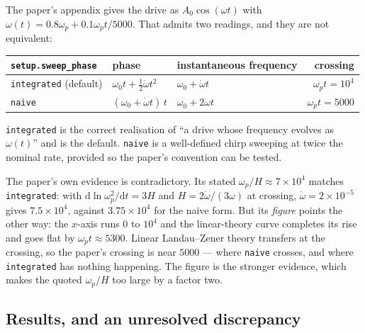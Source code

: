 \documentclass[11pt,a4paper]{article}
\newcommand{\code}[1]{\texttt{\small #1}}
\newcommand{\wpt}{\omega_p t}
\begin{document}
The paper's appendix gives the drive as $A_0\cos(\omega t)$ with
$\omega(t) = 0.8\omega_p + 0.1\omega_p t/5000$. That admits two readings, and they
are not equivalent:

\begin{center}\small
\begin{tabular}{@{}lllr@{}}
\toprule
\code{setup.sweep\_phase} & phase & instantaneous frequency & crossing \\
\midrule
\code{integrated} (default) & $\omega_0 t + \tfrac12\dot\omega t^2$ & $\omega_0+\dot\omega t$ & $\wpt = 10^4$ \\
\code{naive}                & $(\omega_0+\dot\omega t)\,t$          & $\omega_0+2\dot\omega t$ & $\wpt = 5000$ \\
\bottomrule
\end{tabular}
\end{center}

\code{integrated} is the correct realisation of ``a drive whose frequency evolves as
$\omega(t)$'' and is the default. \code{naive} is a well-defined chirp sweeping at
twice the nominal rate, provided so the paper's convention can be tested.

The paper's own evidence is contradictory. Its stated $\omega_p/H\approx7\times10^4$
matches \code{integrated}: with $\mathrm{d}\ln\omega_p^2/\mathrm{d}t = 3H$ and
$H = 2\dot\omega/(3\omega)$ at crossing, $\dot\omega = 2\times10^{-5}$ gives
$7.5\times10^4$, against $3.75\times10^4$ for the naive form. But its
\emph{figure} points the other way: the $x$-axis runs $0$ to $10^4$ and the
linear-theory curve completes its rise and goes flat by $\wpt\approx5300$. Linear
Landau--Zener theory transfers at the crossing, so the paper's crossing is near
$5000$ --- where \code{naive} crosses, and where \code{integrated} has nothing
happening. The figure is the stronger evidence, which makes the quoted
$\omega_p/H$ too large by a factor two.

\subsection{Results, and an unresolved discrepancy}
\end{document}
